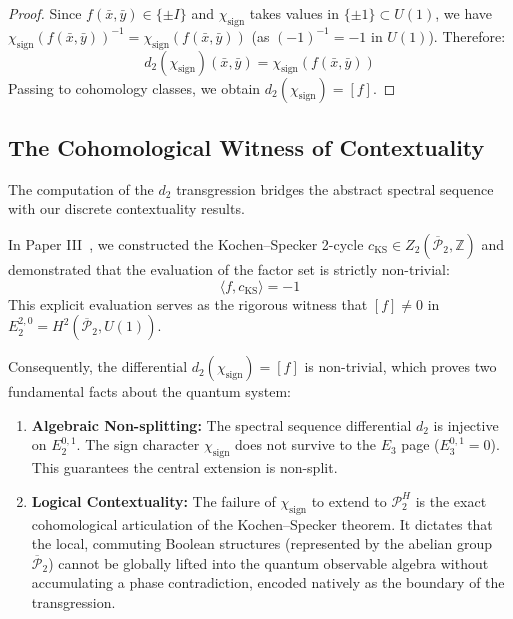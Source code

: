 \documentclass[11pt]{article}
\begin{document}
\begin{proof}
Since $f(\bar{x}, \bar{y}) \in \{\pm I\}$ and $\chi_{\text{sign}}$ takes values in $\{\pm 1\} \subset U(1)$, we have $\chi_{\text{sign}}(f(\bar{x}, \bar{y}))^{-1} = \chi_{\text{sign}}(f(\bar{x}, \bar{y}))$ (as $(-1)^{-1} = -1$ in $U(1)$). Therefore:
\[
    d_2(\chi_{\text{sign}})(\bar{x}, \bar{y}) = \chi_{\text{sign}}(f(\bar{x}, \bar{y}))
\]
Passing to cohomology classes, we obtain $d_2(\chi_{\text{sign}}) = [f]$.
\end{proof}

\subsection{The Cohomological Witness of Contextuality}

The computation of the $d_2$ transgression bridges the abstract spectral sequence with our discrete contextuality results.

In Paper III~\cite{PaperIII}, we constructed the Kochen--Specker 2-cycle $c_{\text{KS}} \in Z_2(\overline{\mathcal{P}}_2, \mathbb{Z})$ and demonstrated that the evaluation of the factor set is strictly non-trivial:
\[
    \langle f, c_{\text{KS}} \rangle = -1
\]
This explicit evaluation serves as the rigorous witness that $[f] \neq 0$ in $E_2^{2,0} = H^2(\overline{\mathcal{P}}_2, U(1))$.

Consequently, the differential $d_2(\chi_{\text{sign}}) = [f]$ is non-trivial, which proves two fundamental facts about the quantum system:
\begin{enumerate}
    \item \textbf{Algebraic Non-splitting:} The spectral sequence differential $d_2$ is injective on $E_2^{0,1}$. The sign character $\chi_{\text{sign}}$ does not survive to the $E_3$ page ($E_3^{0,1} = 0$). This guarantees the central extension is non-split.

    \item \textbf{Logical Contextuality:} The failure of $\chi_{\text{sign}}$ to extend to $\mathcal{P}_2^H$ is the exact cohomological articulation of the Kochen--Specker theorem. It dictates that the local, commuting Boolean structures (represented by the abelian group $\overline{\mathcal{P}}_2$) cannot be globally lifted into the quantum observable algebra without accumulating a phase contradiction, encoded natively as the boundary of the transgression.
\end{enumerate}
\end{document}
